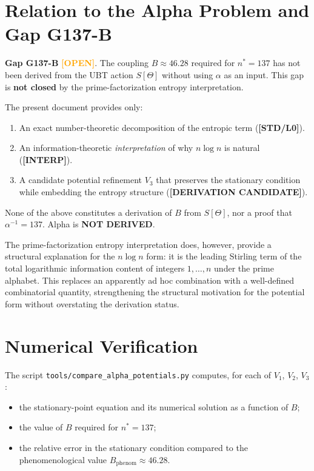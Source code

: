 \documentclass[12pt,a4paper]{article}
\theoremstyle{definition}
\theoremstyle{remark}
\newcommand{\STDLZ}{\textcolor{gray!70!black}{\textbf{[STD/L0]}}}
\newcommand{\INTERP}{\textcolor{blue!60!black}{\textbf{[INTERP]}}}
\newcommand{\DERIVCAND}{\textcolor{orange!80!black}{\textbf{[DERIVATION CANDIDATE]}}}
\newcommand{\OPEN}{\textcolor{orange}{\textbf{[OPEN]}}}
\begin{document}
\section{Relation to the Alpha Problem and Gap G137-B}
\label{sec:alpha_gap}

\begin{gapbox}
\textbf{Gap G137-B} \OPEN{}.  The coupling $B \approx 46.28$ required for
$n^* = 137$ has not been derived from the UBT action $S[\Theta]$ without using
$\alpha$ as an input.  This gap is \textbf{not closed} by the prime-factorization
entropy interpretation.

The present document provides only:
\begin{enumerate}
  \item An exact number-theoretic decomposition of the entropic term (\STDLZ{}).
  \item An information-theoretic \emph{interpretation} of why $n\log n$ is natural
        (\INTERP{}).
  \item A candidate potential refinement $V_3$ that preserves the stationary condition
        while embedding the entropy structure (\DERIVCAND{}).
\end{enumerate}

None of the above constitutes a derivation of $B$ from $S[\Theta]$, nor a proof
that $\alpha^{-1} = 137$.  Alpha is \textbf{NOT DERIVED}.
\end{gapbox}

The prime-factorization entropy interpretation does, however, provide a structural
explanation for the $n\log n$ form: it is the leading Stirling term of the total
logarithmic information content of integers $1, \ldots, n$ under the prime alphabet.
This replaces an apparently ad hoc combination with a well-defined combinatorial
quantity, strengthening the structural motivation for the potential form without
overstating the derivation status.

\section{Numerical Verification}
\label{sec:numeric}

The script \texttt{tools/compare\_alpha\_potentials.py} computes, for each of $V_1$,
$V_2$, $V_3$:
\begin{itemize}
  \item the stationary-point equation and its numerical solution as a function of $B$;
  \item the value of $B$ required for $n^* = 137$;
  \item the relative error in the stationary condition compared to the phenomenological
        value $B_{\mathrm{phenom}} \approx 46.28$.
\end{itemize}
\end{document}

